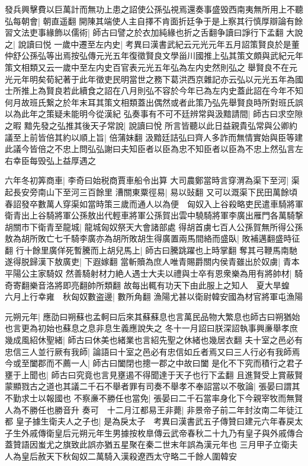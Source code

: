 發兵興擊費以巨萬計而無功上患之詔使公孫弘視焉還奏事盛毁西南夷無所用上不聽弘每朝會|{
	朝直遥翻}
開陳其端使人主自擇不肯面折廷争于是上察其行慎厚辯論有餘習文法吏事緣飾以儒術|{
	師古曰譬之於衣加純緣也折之舌翻争讀曰諍行下孟翻}
大說之|{
	說讀曰悦}
一歲中遷至左内史|{
	考異曰漢書武紀云元光元年五月詔策賢良於是董仲舒公孫弘等出焉按弘傳元光五年復徵賢良文學甾川國推上弘其策文頗與武紀元年策文相類又云一歲中至左内史百官表元光五年弘為左内史然則弘之舉賢良不在元光元年明矣荀紀著于此年徵吏民明當世之務下葛洪西京雜記亦云弘以元光五年為國士所推上為賢良若此續食之詔在八月則弘不容於今年已為左内史蓋此詔在今年不知何月故班氏繋之於年末耳其策文相類蓋出偶然或者此策乃弘先舉賢良時所對班氏誤以為此年之策疑未能明今從漢紀}
弘奏事有不可不廷辨常與汲黯請間|{
	師古曰求空隙之暇}
黯先發之弘推其後天子常說|{
	說讀曰悅}
所言皆聽以此日益親貴弘常與公卿約議至上前皆倍其約以順上旨|{
	倍蒲妹翻}
汲黯廷詰弘曰齊人多詐而無情實始與臣等建此議今皆倍之不忠上問弘弘謝曰夫知臣者以臣為忠不知臣者以臣為不忠上然弘言左右幸臣每毁弘上益厚遇之

六年冬初筭商車|{
	李奇曰始税商賈車船令出算}
大司農鄭當時言穿渭為渠下至河|{
	渠起長安旁南山下至河三百餘里}
漕關東粟徑易|{
	易以䜴翻}
又可以溉渠下民田萬餘頃春詔發卒數萬人穿渠如當時策三歲而通人以為便　匈奴入上谷殺略吏民遣車騎將軍衛青出上谷騎將軍公孫敖出代輕車將軍公孫賀出雲中驍騎將軍李廣出雁門各萬騎撃胡關市下衛青至龍城|{
	龍城匈奴祭天大會諸部處}
得胡首虜七百人公孫賀無所得公孫敖為胡所敗亡七千騎李廣亦為胡所敗胡生得廣置兩馬間絡而盛臥|{
	敗補邁翻盛時征翻}
行十餘里廣佯死暫騰而上胡兒馬上|{
	師古曰騰跳躍也上時掌翻}
奪其弓鞭馬南馳遂得脱歸漢下敖廣吏|{
	下遐嫁翻}
當斬贖為庶人唯青賜爵關内侯青雖出於奴虜|{
	青本平陽公主家騎奴}
然善騎射材力絶人遇士大夫以禮與士卒有恩衆樂為用有將帥材|{
	騎奇寄翻樂音洛將即亮翻帥所類翻}
故每出輒有功天下由此服上之知人　夏大旱蝗　六月上行幸雍　秋匈奴數盗邊|{
	數所角翻}
漁陽尤甚以衛尉韓安國為材官將軍屯漁陽

元朔元年|{
	應劭曰朔蘇也孟軻曰后來其蘇蘇息也言萬民品物大繁息也師古曰朔猶始也言更為初始也蘇息之息非息生義應說失之}
冬十一月詔曰朕深詔執事興亷舉孝庶幾成風紹休聖緒|{
	師古曰休美也緒業也言紹先聖之休緒也幾居衣翻}
夫十室之邑必有忠信三人並行厥有我師|{
	論語曰十室之邑必有忠信如丘者焉又曰三人行必有我師焉}
今或至闔郡而不薦一人|{
	師古曰闔閉也摠一郡之中故曰闔}
是化不下究而積行之君子壅于上聞也|{
	師古曰究竟也言見壅遏不得聞達于天子也行下孟翻}
且進賢受上賞蔽賢蒙顯戮古之道也其議二千石不舉者罪有司奏不舉孝不奉詔當以不敬論|{
	張晏曰謂其不勤求士以報國也}
不察亷不勝任也當免|{
	張晏曰二千石當率身化下今親宰牧而無賢人為不勝任也勝音升}
奏可　十二月江都易王非薨|{
	非景帝子前二年封汝南二年徒江都}
皇子據生衛夫人之子也|{
	是為戾太子　考異曰漢書武五子傳贊曰建元六年春戻太子生外戚傳衛皇后元朔元年生男據按枚臯傳云武帝春秋二十九乃有皇子與外戚傳合蓋贊語因蚩尤之旗致此誤亦猶五星聚在秦二世末年誤為漢元年也}
三月甲子立衛夫人為皇后赦天下秋匈奴二萬騎入漢殺遼西太守略二千餘人圍韓安

